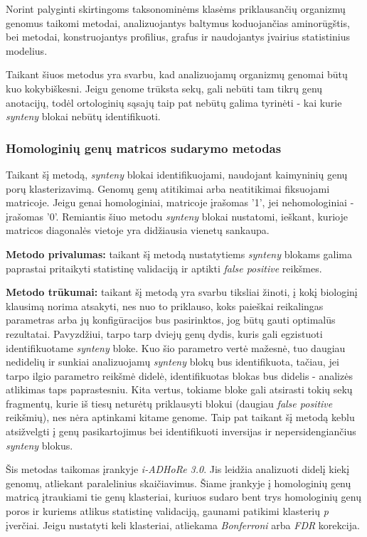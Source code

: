 \documentclass[12pt]{article}
\begin{document}
Norint palyginti skirtingoms taksonominėms klasėms priklausančių organizmų
genomus taikomi metodai, analizuojantys baltymus koduojančias aminorūgštis,
bei metodai, konstruojantys profilius, grafus ir naudojantys įvairius
statistinius modelius.

Taikant šiuos metodus yra svarbu, kad analizuojamų organizmų
genomai būtų kuo kokybiškesni. Jeigu genome trūksta sekų, gali nebūti
tam tikrų genų anotacijų, todėl ortologinių sąsajų taip pat nebūtų galima
tyrinėti - kai kurie \emph{synteny} blokai nebūtų identifikuoti.

\subsubsection*{Homologinių genų matricos sudarymo metodas}

Taikant šį metodą, \emph{synteny} blokai identifikuojami, naudojant kaimyninių
genų porų klasterizavimą. Genomų genų atitikimai arba neatitikimai fiksuojami
matricoje. Jeigu genai homologiniai, matricoje įrašomas '1', jei nehomologiniai
- įrašomas '0'. Remiantis šiuo metodu \emph{synteny} blokai nustatomi, ieškant,
kurioje matricos diagonalės vietoje yra didžiausia vienetų sankaupa.

\textbf{Metodo privalumas:} taikant šį metodą nustatytiems \emph{synteny}
blokams galima paprastai pritaikyti statistinę validaciją ir aptikti
\emph{false positive} reikšmes.

\textbf{Metodo trūkumai:} taikant šį metodą yra svarbu tiksliai žinoti, į kokį
biologinį klausimą norima atsakyti, nes nuo to priklauso, koks paieškai
reikalingas parametras arba jų konfigūracijos bus pasirinktos, jog būtų gauti
optimalūs rezultatai. Pavyzdžiui, tarpo tarp dviejų genų dydis, kuris gali
egzistuoti identifikuotame \emph{synteny} bloke. Kuo šio parametro vertė
mažesnė, tuo daugiau nedidelių ir sunkiai analizuojamų \emph{synteny} blokų
bus identifikuota, tačiau, jei tarpo ilgio parametro reikšmė didelė,
identifikuotas blokas bus didelis - analizės atlikimas taps paprastesniu. Kita
vertus, tokiame bloke gali atsirasti tokių sekų fragmentų, kurie iš tiesų
neturėtų priklausyti blokui (daugiau \emph{false positive} reikšmių), nes nėra
aptinkami kitame genome. Taip pat taikant šį metodą keblu atsižvelgti į genų
pasikartojimus bei identifikuoti inversijas ir nepersidengiančius
\emph{synteny} blokus.

Šis metodas taikomas įrankyje \emph{i-ADHoRe 3.0}\cite{IADHORE}. Jis leidžia
analizuoti didelį kiekį genomų, atliekant paralelinius skaičiavimus. Šiame
įrankyje į homologinių genų matricą įtraukiami tie genų klasteriai,
kuriuos sudaro bent trys homologinių genų poros ir kuriems atlikus statistinę
validaciją, gaunami patikimi klasterių \emph{p} įverčiai. Jeigu nustatyti keli
klasteriai, atliekama \emph{Bonferroni} arba \emph{FDR} korekcija.
\end{document}
